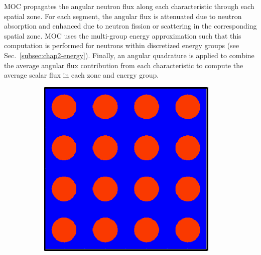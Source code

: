 \ac{MOC} propagates the angular neutron flux along each characteristic through each spatial zone. For each segment, the angular flux is attenuated due to neutron absorption and enhanced due to neutron fission or scattering in the corresponding spatial zone. \ac{MOC} uses the multi-group energy approximation such that this computation is performed for neutrons within discretized energy groups (see Sec.~\ref{subsec:chap2-energy}). Finally, an angular quadrature is applied to combine the average angular flux contribution from each characteristic to compute the average scalar flux in each zone and energy group.

\begin{figure}[h!]
  \begin{subfigure}[htb!]{0.32\textwidth}
    \centering
    \includegraphics[width=0.95\textwidth]{figures/workflow/openmoc/materials-border}
    \label{fig:moc-model-materials}
    \caption{}
  \end{subfigure}
  \begin{subfigure}[htb!]{0.32\textwidth}
    \centering

\end{subfigure}
\end{figure}

